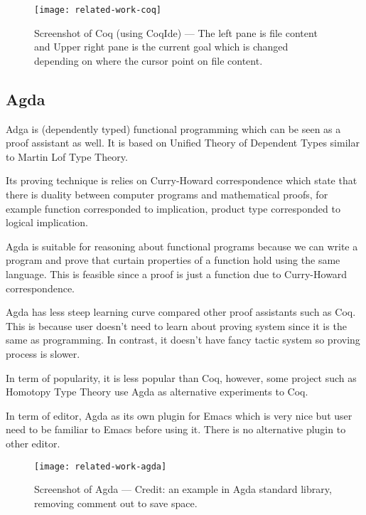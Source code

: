 \documentclass[master.tex]{subfiles}
\begin{document}
\begin{figure}[H]
    \centering
    \texttt{[image: related-work-coq]}
    \caption{Screenshot of Coq (using CoqIde) --- The left pane is file content
      and Upper right pane is the current goal which is changed depending on
      where the cursor point on file content.}
\label{fig:background-coq}
\end{figure}

\subsection{Agda}
Adga\supercite{agda-official-website} is (dependently typed) functional
programming which can be seen as a proof assistant as well. It is based on
Unified Theory of Dependent
Types\supercite{norell:thesis}\supercite{Luo:1994:CRT:184757} similar to Martin
Lof Type Theory.

Its proving technique is relies on Curry-Howard correspondence
which state that there is duality between computer programs and mathematical
proofs\supercite{curry-howard-correspondence}, for example function corresponded
to implication, product type corresponded to logical implication.

Agda is suitable for reasoning about functional programs because we can write a
program and prove that curtain properties of a function hold using the same
language. This is feasible since a proof is just a function due to Curry-Howard
correspondence.

Agda has less steep learning curve compared other proof assistants such as Coq.
This is because user doesn't need to learn about proving
system since it is the same as programming. In contrast, it doesn't have
fancy tactic system so proving process is slower.

In term of popularity, it is less popular than Coq, however, some project such
as Homotopy Type Theory\supercite{hott-coq-repo}\supercite{hott-agda-repo} use
Agda as alternative experiments to Coq.

In term of editor, Agda as its own plugin for Emacs which is very nice but user
need to be familiar to Emacs before using it. There is no alternative plugin to
other editor.

\begin{figure}[H]
    \centering
    \texttt{[image: related-work-agda]}
    \caption{Screenshot of Agda --- Credit: an example in Agda standard library,
    removing comment out to save space.}
\label{fig:background-coq}
\end{figure}
\end{document}
